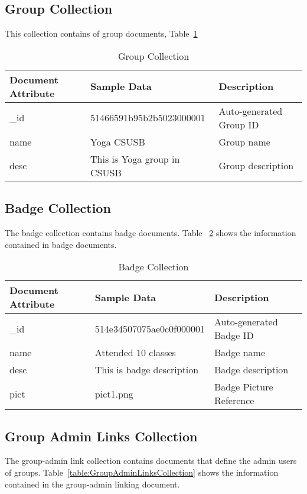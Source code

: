 \subsection{Group Collection}
This collection contains of group documents,  Table~\ref{table:GroupCollection}

\begin{table}[H]
\caption{Group Collection}\label{table:GroupCollection}
\textbf{ }
\begin{center}
\begin{tabular}{ | l | l |  l | }
\hline
Document Attribute & Sample Data & Description \\ \hline
{\_}id &  51466591b95b2b5023000001 & Auto-generated Group ID \\ \hline
name & Yoga CSUSB & Group name   \\ \hline
desc & This is Yoga group in CSUSB & Group description   \\ \hline
\end{tabular}
\end{center}
\end{table}


\subsection{Badge Collection}
The badge collection contains badge documents. Table ~\ref{table:BadgeCollection} shows the information contained in badge documents.

\begin{table}[H]
\caption{Badge Collection}\label{table:BadgeCollection}
\textbf{ }
\begin{center}
\begin{tabular}{ | l | l |  l | }
\hline
Document Attribute & Sample Data & Description \\ \hline
{\_}id & 514e34507075ae0c0f000001 & Auto-generated Badge ID \\ \hline
name & Attended 10 classes & Badge name   \\ \hline
desc & This is badge description & Badge description   \\ \hline
pict & pict1.png & Badge Picture Reference   \\ \hline
\end{tabular}
\end{center}
\end{table}


\subsection{Group Admin Links Collection}
The group-admin link collection contains documents that define the admin users of groups.  Table~\ref{table:GroupAdminLinksCollection} shows the information contained in the group-admin linking document.

